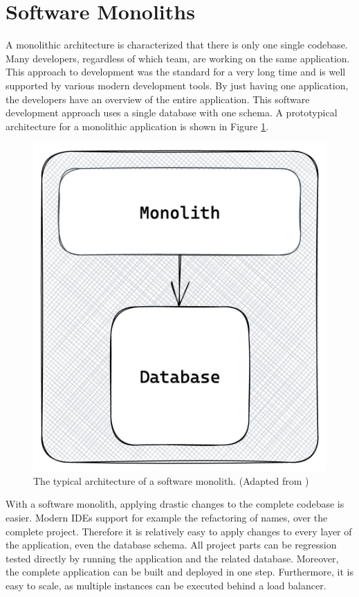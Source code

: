 \section{Software Monoliths}\label{section:background:software-monolith}

A monolithic architecture is characterized that there is only one single codebase. Many developers, regardless of which team, are working on the same application. This approach to development was the standard for a very long time and is well supported by various modern development tools. By just having one application, the developers have an overview of the entire application. This software development approach uses a single database with one schema. A prototypical architecture for a monolithic application is shown in Figure \ref{fig:background:monolith:monolith-sketch}.

\ifshowImages
\begin{figure}[H]
  \centering
  \includegraphics[width=0.3\linewidth]{images/background/monolith/monolith-sketch.png}
  \caption{The typical architecture of a software monolith. (Adapted from \cite[12]{book:2019:newman:background:monolith:monolith-to-microservices})}\label{fig:background:monolith:monolith-sketch}
\end{figure}
\fi

\noindent With a software monolith, applying drastic changes to the complete codebase is easier. Modern \acp{IDE} support for example the refactoring of names, over the complete project. Therefore it is relatively easy to apply changes to every layer of the application, even the database schema. All project parts can be regression tested directly by running the application and the related database. Moreover, the complete application can be built and deployed in one step. Furthermore, it is easy to scale, as multiple instances can be executed behind a load balancer. \cite[4]{book:2018:richardson:background:bff:microservices-patterns}

\bigskip

